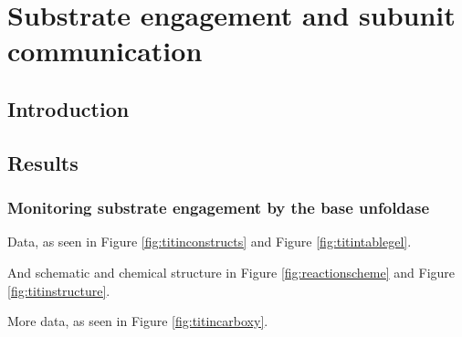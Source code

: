 
\chapter{Substrate engagement and subunit communication} %
\label{Chapter4}


\section{Introduction}


\section{Results}

\subsection{Monitoring substrate engagement by the base unfoldase}


Data, as seen in Figure \ref{fig:titinconstructs} and Figure \ref{fig:titintablegel}.

And schematic and chemical structure in Figure \ref{fig:reactionscheme} and Figure \ref{fig:titinstructure}.

More data, as seen in Figure \ref{fig:titincarboxy}.



